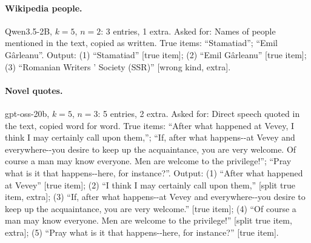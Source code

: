 \paragraph{Wikipedia people.} Qwen3.5-2B, $k = 5$, $n = 2$: 3 entries, 1 extra.
Asked for: Names of people mentioned in the text, copied as written.
True items: ``Stamatiad''; ``Emil Gârleanu''.
Output: (1) ``Stamatiad'' [true item]; (2) ``Emil Gârleanu'' [true item]; (3) ``Romanian Writers ' Society (SSR)'' [wrong kind, extra].

\paragraph{Novel quotes.} gpt-oss-20b, $k = 5$, $n = 3$: 5 entries, 2 extra.
Asked for: Direct speech quoted in the text, copied word for word.
True items: ``After what happened at Vevey, I think I may certainly call upon them,''; ``If, after what happens-{}-at Vevey and everywhere-{}-you desire to keep up the acquaintance, you are very welcome. Of course a man may know everyone. Men are welcome to the privilege!''; ``Pray what is it that happens-{}-here, for instance?''.
Output: (1) ``After what happened at Vevey'' [true item]; (2) ``I think I may certainly call upon them,'' [split true item, extra]; (3) ``If, after what happens-{}-at Vevey and everywhere-{}-you desire to keep up the acquaintance, you are very welcome.'' [true item]; (4) ``Of course a man may know everyone. Men are welcome to the privilege!'' [split true item, extra]; (5) ``Pray what is it that happens-{}-here, for instance?'' [true item].

